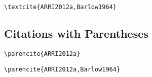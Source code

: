 \begin{lstlisting}[caption={Citation for Multiple Authors.}]
\textcite{ARRI2012a,Barlow1964}
\end{lstlisting}

\textcite{ARRI2012a,Barlow1964}

\subsection*{Citations with Parentheses}%
\label{subsec:citations-with-parentheses}

\begin{lstlisting}[caption={Citation with Parentheses for Single Author.}]
\parencite{ARRI2012a}
\end{lstlisting}

\parencite{ARRI2012a}

\begin{lstlisting}[caption={Citation with Parentheses for Multiple Authors.}s]
\parencite{ARRI2012a,Barlow1964}
\end{lstlisting}

\parencite{ARRI2012a,Barlow1964}

